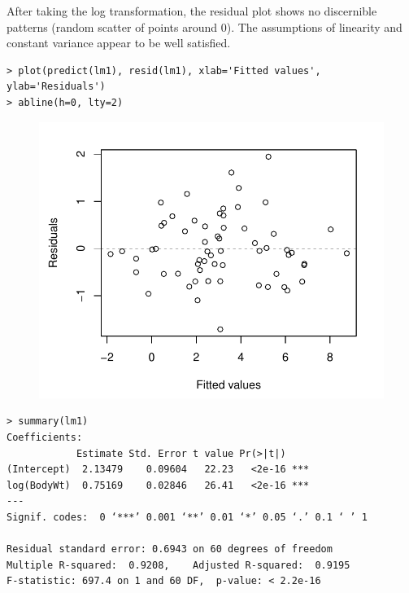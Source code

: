 \documentclass[10pt]{beamer}
\begin{document}
\begin{frame}[fragile]
After taking the log transformation, the residual plot shows no discernible patterns (random scatter of points around 0).  The assumptions of linearity and constant variance appear to be well satisfied.
\small
\begin{verbatim}
> plot(predict(lm1), resid(lm1), xlab='Fitted values', ylab='Residuals')
> abline(h=0, lty=2)
\end{verbatim}
\begin{figure}
\includegraphics[scale=0.5]{figure/logbrain_resid.pdf}
\end{figure}
\end{frame}

\begin{frame}[fragile]
\small
\begin{verbatim}
> summary(lm1)
Coefficients:
            Estimate Std. Error t value Pr(>|t|)    
(Intercept)  2.13479    0.09604   22.23   <2e-16 ***
log(BodyWt)  0.75169    0.02846   26.41   <2e-16 ***
---
Signif. codes:  0 ‘***’ 0.001 ‘**’ 0.01 ‘*’ 0.05 ‘.’ 0.1 ‘ ’ 1

Residual standard error: 0.6943 on 60 degrees of freedom
Multiple R-squared:  0.9208,	Adjusted R-squared:  0.9195 
F-statistic: 697.4 on 1 and 60 DF,  p-value: < 2.2e-16
\end{verbatim}
\end{frame}
\end{document}
